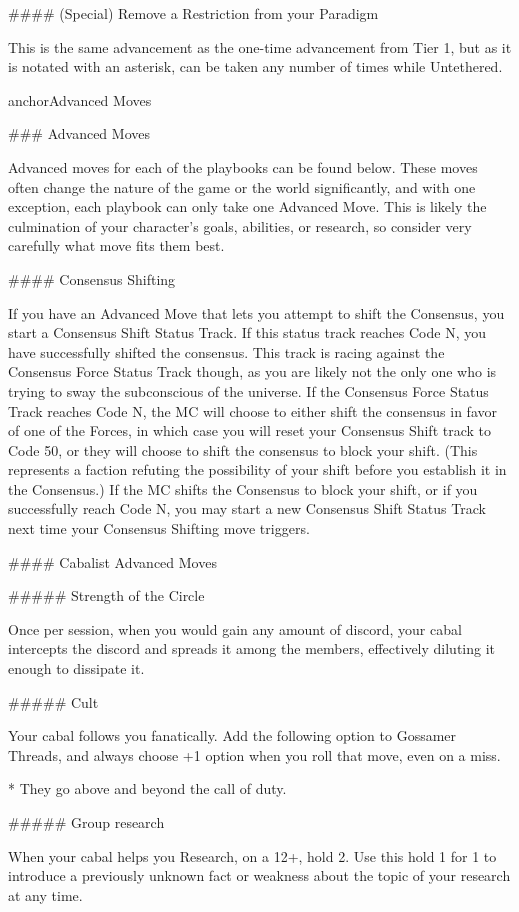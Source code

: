 \documentclass[
  oneside,
  statementpaper,
  9pt]{memoir}
\begin{document}
\begin{Player}
#### (Special) Remove a Restriction from your Paradigm

This is the same advancement as the one-time advancement from Tier 1, but as it is notated with an asterisk, can be taken any number of times while Untethered.

{{anchorAdvanced Moves}}

### Advanced Moves

Advanced moves for each of the playbooks can be found below. These moves often change the nature of the game or the world significantly, and with one exception, each playbook can only take one Advanced Move. This is likely the culmination of your character’s goals, abilities, or research, so consider very carefully what move fits them best.

#### Consensus Shifting

If you have an Advanced Move that lets you attempt to shift the Consensus, you start a Consensus Shift Status Track. If this status track reaches Code N, you have successfully shifted the consensus. This track is racing against the Consensus Force Status Track though, as you are likely not the only one who is trying to sway the subconscious of the universe. If the Consensus Force Status Track reaches Code N, the MC will choose to either shift the consensus in favor of one of the Forces, in which case you will reset your Consensus Shift track to Code 50, or they will choose to shift the consensus to block your shift. (This represents a faction refuting the possibility of your shift before you establish it in the Consensus.)  If the MC shifts the Consensus to block your shift, or if you successfully reach Code N, you may start a new Consensus Shift Status Track next time your Consensus Shifting move triggers.

#### Cabalist Advanced Moves

##### Strength of the Circle

Once per session, when you would gain any amount of discord, your cabal intercepts the discord and spreads it among the members, effectively diluting it enough to dissipate it.

##### Cult

Your cabal follows you fanatically. Add the following option to Gossamer Threads, and always choose +1 option when you roll that move, even on a miss.

* They go above and beyond the call of duty.

##### Group research

When your cabal helps you Research, on a 12+, hold 2. Use this hold 1 for 1 to introduce a previously unknown fact or weakness about the topic of your research at any time.


\end{Player}
\end{document}
